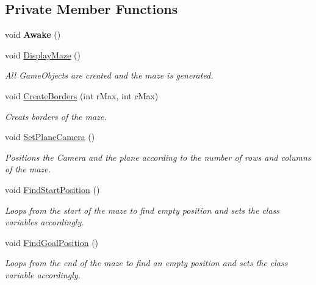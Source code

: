 \subsection*{Private Member Functions}
\begin{DoxyCompactItemize}
\item 
\mbox{\label{class_maze_constructor_af083615d1845fe989492cb9fd02710e8}} 
void {\bfseries Awake} ()
\item 
void \mbox{\hyperlink{class_maze_constructor_a668f57a3dcd26933754452e599ac2dca}{Display\+Maze}} ()
\begin{DoxyCompactList}\small\item\em All Game\+Objects are created and the maze is generated. \end{DoxyCompactList}\item 
void \mbox{\hyperlink{class_maze_constructor_a335b2f75bf36c705301c114173201231}{Create\+Borders}} (int r\+Max, int c\+Max)
\begin{DoxyCompactList}\small\item\em Creats borders of the maze. \end{DoxyCompactList}\item 
void \mbox{\hyperlink{class_maze_constructor_a209b5c76afef240cbcfbd50032d6e35a}{Set\+Plane\+Camera}} ()
\begin{DoxyCompactList}\small\item\em Positions the Camera and the plane according to the number of rows and columns of the maze. \end{DoxyCompactList}\item 
void \mbox{\hyperlink{class_maze_constructor_a14d31f67a9de9f2351935e29f8d6ee6f}{Find\+Start\+Position}} ()
\begin{DoxyCompactList}\small\item\em Loops from the start of the maze to find empty position and sets the class variables accordingly. \end{DoxyCompactList}\item 
void \mbox{\hyperlink{class_maze_constructor_a4c39dbb28528047a9bca89c29dbaf3d3}{Find\+Goal\+Position}} ()
\begin{DoxyCompactList}\small\item\em Loops from the end of the maze to find an empty position and sets the class variable accordingly. \end{DoxyCompactList}\end{DoxyCompactItemize}
